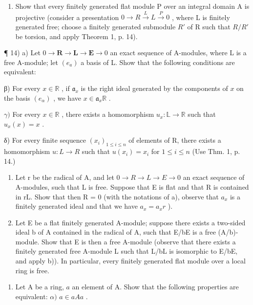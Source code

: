 \begin{enumerate}
\def\labelenumi{\arabic{enumi})}
\setcounter{enumi}{12}
\tightlist
\item
  Show that every finitely generated flat module P over an integral domain A is projective (consider a presentation \(0 \rightarrow R \xrightarrow{L} L \xrightarrow{P} 0\) , where L is finitely generated free; choose a finitely generated submodule \(R'\) of R such that \(R/R'\) be torsion, and apply Theorem 1, p. 14).
\end{enumerate}

¶ 14) a) Let \(0 \to \mathbf{R} \to \mathbf{L} \to \mathbf{E} \to 0\) an exact sequence of A-modules, where L is a free A-module; let \((e_{a})\) a basis of L. Show that the following conditions are equivalent:

β) For every \(x \in \mathbb{R}\) , if \(\mathfrak{a}_{x}\) is the right ideal generated by the components of \(x\) on the basis \((e_{\alpha})\) , we have \(x \in \mathfrak{a}_{x} \mathbb{R}\) .

\(\gamma)\) For every \(x \in \mathbb{R}\) , there exists a homomorphism \(u_x: \mathbb{L} \to \mathbb{R}\) such that \(u_x(x) = x\) .

δ) For every finite sequence \((x_{i})_{1\leqslant i\leqslant n}\) of elements of R, there exists a homomorphism \(u:L\to R\) such that \(u(x_{i})=x_{i}\) for \(1\leqslant i\leqslant n\) (Use Thm. 1, p. 14.)

\begin{enumerate}
\def\labelenumi{\alph{enumi})}
\setcounter{enumi}{1}
\item
  Let r be the radical of A, and let \(0 \rightarrow R \rightarrow L \rightarrow E \rightarrow 0\) an exact sequence of A-modules, such that L is free. Suppose that E is flat and that R is contained in rL. Show that then R = 0 (with the notations of a), observe that \(a_{x}\) is a finitely generated ideal and that we have \(a_{x} = a_{x} r\) ).
\item
  Let E be a flat finitely generated A-module; suppose there exists a two-sided ideal b of A contained in the radical of A, such that E/bE is a free (A/b)-module. Show that E is then a free A-module (observe that there exists a finitely generated free A-module L such that L/bL is isomorphic to E/bE, and apply b)). In particular, every finitely generated flat module over a local ring is free.
\end{enumerate}

\begin{enumerate}
\def\labelenumi{\arabic{enumi})}
\setcounter{enumi}{14}
\tightlist
\item
  Let A be a ring, \(a\) an element of A. Show that the following properties are equivalent: \(\alpha)\) \(a\in aAa\) .
\end{enumerate}

